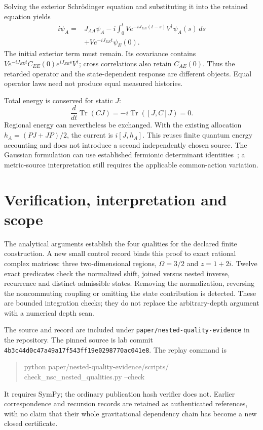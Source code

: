 \documentclass[11pt]{article}
\newcommand{\Tr}{\operatorname{Tr}}
\begin{document}
Solving the exterior Schr\"odinger equation and substituting it into the
retained equation yields
\begin{align}\label{eq:memory}
 i\dot\psi_A={}&J_{AA}\psi_A
 -i\int_0^t V e^{-iJ_{EE}(t-s)}V^\dagger\psi_A(s)\,ds\nonumber\\
 &+V e^{-iJ_{EE}t}\psi_E(0).
\end{align}
The initial exterior term must remain. Its covariance contains
$V e^{-iJ_{EE}t}C_{EE}(0)e^{iJ_{EE}s}V^\dagger$; cross correlations also
retain $C_{AE}(0)$. Thus the retarded operator and the state-dependent
response are different objects. Equal operator laws need not produce
equal measured histories.

Total energy is conserved for static $J$:
\begin{equation}
 \frac{d}{dt}\Tr(CJ)=-i\Tr([J,C]J)=0.
\end{equation}
Regional energy can nevertheless be exchanged. With the existing allocation
$h_A=(PJ+JP)/2$, the current is $i[J,h_A]$. This reuses finite quantum
energy accounting and does not introduce a second independently chosen
source. The Gaussian formulation can use established fermionic determinant
identities~\cite{Klich2003}; a metric-source interpretation still requires
the applicable common-action variation.

\section{Verification, interpretation and scope}
The analytical arguments establish the four qualities for the declared
finite construction. A new small control record binds this proof to exact
rational complex matrices: three two-dimensional regions, $\Omega=3/2$
and $z=1+2i$. Twelve exact predicates check the normalized shift, joined
versus nested inverse, recurrence and distinct admissible states. Removing
the normalization, reversing the noncommuting coupling or omitting the
state contribution is detected. These are bounded integration checks;
they do not replace the arbitrary-depth argument with a numerical depth scan.

The source and record are included under \texttt{paper/nested-quality-evidence}
in the repository. The pinned source is lab commit
\texttt{4b3c44d0c47a49a17f543ff19e0298770ac041e8}.
The replay command is
\begin{quote}\small\ttfamily
python paper/nested-quality-evidence/scripts/\\
check\_nsc\_nested\_qualities.py --check
\end{quote}
It requires SymPy; the ordinary publication hash verifier does not.
Earlier correspondence and recursion records are retained as authenticated
references, with no claim that their whole gravitational dependency chain
has become a new closed certificate.
\end{document}
